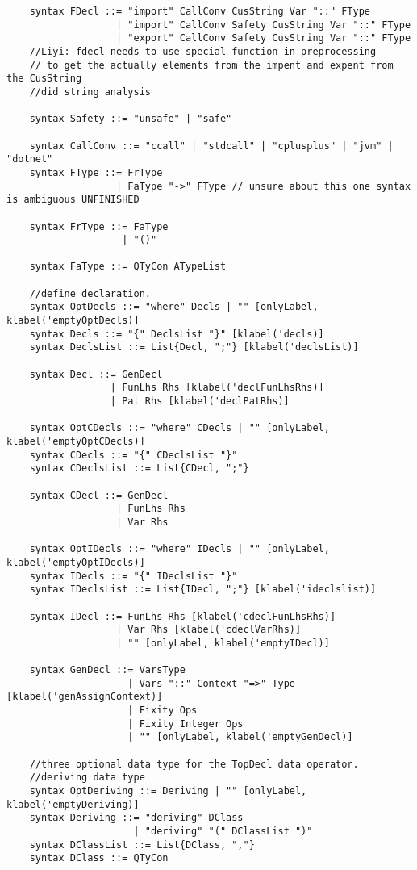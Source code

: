\begin{lstlisting}
    syntax FDecl ::= "import" CallConv CusString Var "::" FType
                   | "import" CallConv Safety CusString Var "::" FType
                   | "export" CallConv Safety CusString Var "::" FType
    //Liyi: fdecl needs to use special function in preprocessing
    // to get the actually elements from the impent and expent from the CusString
    //did string analysis
    
    syntax Safety ::= "unsafe" | "safe"
                   
    syntax CallConv ::= "ccall" | "stdcall" | "cplusplus" | "jvm" | "dotnet"
    syntax FType ::= FrType
                   | FaType "->" FType // unsure about this one syntax is ambiguous UNFINISHED
    
    syntax FrType ::= FaType
                    | "()"
                    
    syntax FaType ::= QTyCon ATypeList

    //define declaration.
    syntax OptDecls ::= "where" Decls | "" [onlyLabel, klabel('emptyOptDecls)]
    syntax Decls ::= "{" DeclsList "}" [klabel('decls)]
    syntax DeclsList ::= List{Decl, ";"} [klabel('declsList)]

    syntax Decl ::= GenDecl
                  | FunLhs Rhs [klabel('declFunLhsRhs)]
                  | Pat Rhs [klabel('declPatRhs)]

    syntax OptCDecls ::= "where" CDecls | "" [onlyLabel, klabel('emptyOptCDecls)]
    syntax CDecls ::= "{" CDeclsList "}"
    syntax CDeclsList ::= List{CDecl, ";"}

    syntax CDecl ::= GenDecl
                   | FunLhs Rhs
                   | Var Rhs

    syntax OptIDecls ::= "where" IDecls | "" [onlyLabel, klabel('emptyOptIDecls)]
    syntax IDecls ::= "{" IDeclsList "}"
    syntax IDeclsList ::= List{IDecl, ";"} [klabel('ideclslist)]

    syntax IDecl ::= FunLhs Rhs [klabel('cdeclFunLhsRhs)]
                   | Var Rhs [klabel('cdeclVarRhs)]
                   | "" [onlyLabel, klabel('emptyIDecl)]

    syntax GenDecl ::= VarsType
                     | Vars "::" Context "=>" Type   [klabel('genAssignContext)]
                     | Fixity Ops
                     | Fixity Integer Ops
                     | "" [onlyLabel, klabel('emptyGenDecl)]

    //three optional data type for the TopDecl data operator. 
    //deriving data type
    syntax OptDeriving ::= Deriving | "" [onlyLabel, klabel('emptyDeriving)]
    syntax Deriving ::= "deriving" DClass
                      | "deriving" "(" DClassList ")"
    syntax DClassList ::= List{DClass, ","}
    syntax DClass ::= QTyCon


\end{lstlisting}
